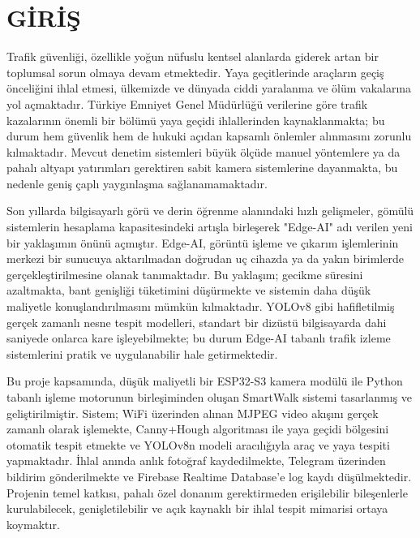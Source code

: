 \section{GİRİŞ}

Trafik güvenliği, özellikle yoğun nüfuslu kentsel alanlarda giderek artan bir toplumsal sorun olmaya devam etmektedir. Yaya geçitlerinde araçların geçiş önceliğini ihlal etmesi, ülkemizde ve dünyada ciddi yaralanma ve ölüm vakalarına yol açmaktadır. Türkiye Emniyet Genel Müdürlüğü verilerine göre trafik kazalarının önemli bir bölümü yaya geçidi ihlallerinden kaynaklanmakta; bu durum hem güvenlik hem de hukuki açıdan kapsamlı önlemler alınmasını zorunlu kılmaktadır. Mevcut denetim sistemleri büyük ölçüde manuel yöntemlere ya da pahalı altyapı yatırımları gerektiren sabit kamera sistemlerine dayanmakta, bu nedenle geniş çaplı yaygınlaşma sağlanamamaktadır.

Son yıllarda bilgisayarlı görü ve derin öğrenme alanındaki hızlı gelişmeler, gömülü sistemlerin hesaplama kapasitesindeki artışla birleşerek "Edge-AI" adı verilen yeni bir yaklaşımın önünü açmıştır. Edge-AI, görüntü işleme ve çıkarım işlemlerinin merkezi bir sunucuya aktarılmadan doğrudan uç cihazda ya da yakın birimlerde gerçekleştirilmesine olanak tanımaktadır. Bu yaklaşım; gecikme süresini azaltmakta, bant genişliği tüketimini düşürmekte ve sistemin daha düşük maliyetle konuşlandırılmasını mümkün kılmaktadır. YOLOv8 gibi hafifletilmiş gerçek zamanlı nesne tespit modelleri, standart bir dizüstü bilgisayarda dahi saniyede onlarca kare işleyebilmekte; bu durum Edge-AI tabanlı trafik izleme sistemlerini pratik ve uygulanabilir hale getirmektedir.

Bu proje kapsamında, düşük maliyetli bir ESP32-S3 kamera modülü ile Python tabanlı işleme motorunun birleşiminden oluşan SmartWalk sistemi tasarlanmış ve geliştirilmiştir. Sistem; WiFi üzerinden alınan MJPEG video akışını gerçek zamanlı olarak işlemekte, Canny+Hough algoritması ile yaya geçidi bölgesini otomatik tespit etmekte ve YOLOv8n modeli aracılığıyla araç ve yaya tespiti yapmaktadır. İhlal anında anlık fotoğraf kaydedilmekte, Telegram üzerinden bildirim gönderilmekte ve Firebase Realtime Database'e log kaydı düşülmektedir. Projenin temel katkısı, pahalı özel donanım gerektirmeden erişilebilir bileşenlerle kurulabilecek, genişletilebilir ve açık kaynaklı bir ihlal tespit mimarisi ortaya koymaktır.

